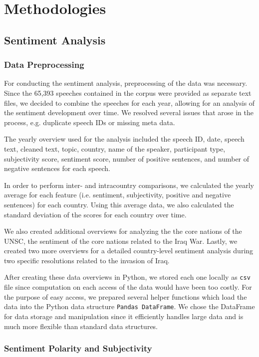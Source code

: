 \section{Methodologies}
\label{methods}

\subsection{Sentiment Analysis}
\subsubsection{Data Preprocessing}
For conducting the sentiment analysis, preprocessing of the data was necessary. Since the 65,393 speeches contained in the corpus were provided as separate text files, we decided to combine the speeches for each year, allowing for an analysis of the sentiment development over time. 
We resolved several issues that arose in the process, e.g. duplicate speech IDs or missing meta data. 

The yearly overview used for the analysis included the speech ID, date, speech text, cleaned text, topic, country, name of the speaker, participant type, subjectivity score, sentiment score, number of positive sentences, and number of negative sentences for each speech.

In order to perform inter- and intracountry comparisons, we calculated the yearly average for each feature (i.e. sentiment, subjectivity, positive and negative sentences) for each country. Using this average data, we also calculated the standard deviation of the scores for each country over time. 

We also created additional overviews for analyzing the the core nations of the UNSC, the sentiment of the core nations related to the Iraq War. Lastly, we created two more overviews for a detailed country-level sentiment analysis during two specific resolutions related to the invasion of Iraq. 

After creating these data overviews in Python, we stored each one locally as \texttt{csv} file since computation on each access of the data would have been too costly. For the purpose of easy access, we prepared several helper functions which load the data into the Python data structure \texttt{Pandas DataFrame}. We chose the DataFrame for data storage and manipulation since it efficiently handles large data and is much more flexible than standard data structures.

\subsubsection{Sentiment Polarity and Subjectivity}

